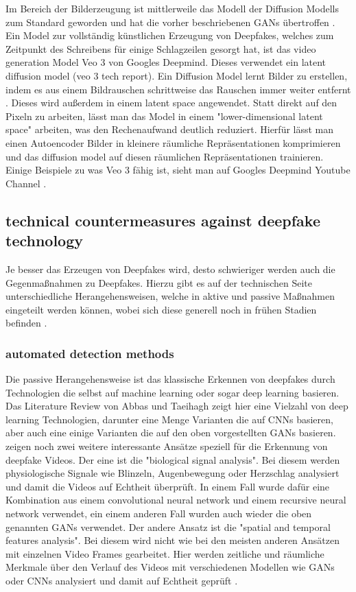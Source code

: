 Im Bereich der Bilderzeugung ist mittlerweile das Modell der Diffusion Modells zum Standard geworden \cite{guptaPhotorealisticVideoGeneration} 
und hat die vorher beschriebenen GANs übertroffen \cite{williampeeblesScalableDiffusionModels}. 
Ein Model zur vollständig künstlichen Erzeugung von Deepfakes, welches zum Zeitpunkt des Schreibens für einige Schlagzeilen \cite{proschofskyGooglesNeueVideoKI2025} gesorgt hat, 
ist das video generation Model Veo 3 von Googles Deepmind. Dieses verwendet ein latent diffusion model (veo 3 tech report). 
Ein Diffusion Model lernt Bilder zu erstellen, indem es aus einem Bildrauschen schrittweise das Rauschen immer weiter entfernt \cite{guptaPhotorealisticVideoGeneration}. 
Dieses wird außerdem in einem latent space angewendet. Statt direkt auf den Pixeln zu arbeiten, 
lässt man das Model in einem "lower-dimensional latent space" \cite{guptaPhotorealisticVideoGeneration} arbeiten, was den Rechenaufwand deutlich reduziert. 
Hierfür lässt man einen Autoencoder Bilder in kleinere räumliche Repräsentationen komprimieren und das diffusion model auf diesen räumlichen Repräsentationen trainieren. 
Einige Beispiele zu was Veo 3 fähig ist, sieht man auf Googles Deepmind Youtube Channel \cite{Veo3Our}.

\subsection{technical countermeasures against deepfake technology}
Je besser das Erzeugen von Deepfakes wird, desto schwieriger werden auch die Gegenmaßnahmen zu Deepfakes. 
Hierzu gibt es auf der technischen Seite unterschiedliche Herangehensweisen, welche in aktive und passive Maßnahmen eingeteilt werden können, 
wobei sich diese generell noch in frühen Stadien befinden \cite{abbasUnmaskingDeepfakesSystematic2024}.
\subsubsection{automated detection methods}
Die passive Herangehensweise ist das klassische Erkennen von deepfakes durch Technologien die selbst auf machine learning oder sogar deep learning basieren. 
Das Literature Review von Abbas und Taeihagh zeigt hier eine Vielzahl von deep learning Technologien, 
darunter eine Menge Varianten die auf CNNs basieren, aber auch eine einige Varianten die auf den oben vorgestellten GANs basieren. 
\textcite{benaissaOverviewGANDeepFakesDetection2024} zeigen noch zwei weitere interessante Ansätze speziell für die Erkennung von deepfake Videos. 
Der eine ist die "biological signal analysis". Bei diesem werden physiologische Signale wie Blinzeln, Augenbewegung oder Herzschlag analysiert und damit die Videos auf Echtheit überprüft. 
In einem Fall wurde dafür eine Kombination aus einem convolutional neural network und einem recursive neural network verwendet, 
ein einem anderen Fall wurden auch wieder die oben genannten GANs verwendet.
Der andere Ansatz ist die "spatial and temporal features analysis". Bei diesem wird nicht wie bei den meisten anderen Ansätzen mit einzelnen Video Frames gearbeitet. 
Hier werden zeitliche und räumliche Merkmale über den Verlauf des Videos mit verschiedenen Modellen wie GANs oder CNNs analysiert und damit auf Echtheit geprüft \cite{benaissaOverviewGANDeepFakesDetection2024}.
